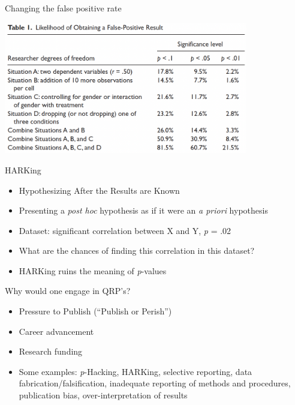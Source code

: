 \documentclass[
  ignorenonframetext,
  aspectratio=169,
]{beamer}
\providecommand{\tightlist}{%
  \setlength{\itemsep}{0pt}\setlength{\parskip}{0pt}}\usepackage{longtable,booktabs,array}
\begin{document}
\begin{frame}{Changing the false positive rate}
\label{changing-the-false-positive-rate}
\begin{center}
\includegraphics[width=0.8\textwidth,height=\textheight]{figs/p-Hacking-table.png}
\end{center}
\end{frame}

\begin{frame}{HARKing}
\label{harking}
\begin{itemize}[<+->]
\tightlist
\item
  Hypothesizing After the Results are Known
\item
  Presenting a \emph{post hoc} hypothesis as if it were an \emph{a
  priori} hypothesis
\item
  Dataset: significant correlation between X and Y, \emph{p} = .02
\item
  What are the chances of finding this correlation in this dataset?
\item
  HARKing ruins the meaning of \emph{p}-values
\end{itemize}
\end{frame}

\begin{frame}{Why would one engage in QRP's?}
\label{why-would-one-engage-in-qrps}
\begin{itemize}[<+->]
\tightlist
\item
  Pressure to Publish (``Publish or Perish'')
\item
  Career advancement
\item
  Research funding
\item
  Some examples: \emph{p}-Hacking, HARKing, selective reporting, data
  fabrication/falsification, inadequate reporting of methods and
  procedures, publication bias, over-interpretation of results
\end{itemize}
\end{frame}
\end{document}
